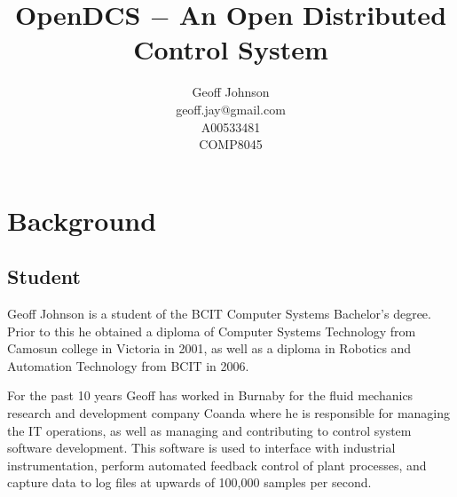 \documentclass[11pt]{article}
\begin{document}
\nocite{*}

  \title{%
    OpenDCS $-$ An Open Distributed Control System\vspace{2em}
  }

  \author{%
    Geoff Johnson \vspace{0.5em} \\
    geoff.jay@gmail.com \vspace{0.5em} \\
    A00533481 \vspace{0.5em} \\
    COMP8045 \vspace{0.5em}
  }

  \maketitle
  \thispagestyle{empty}
  \newpage
  \mbox{}
  \thispagestyle{empty}

  \newpage
  \addtocounter{page}{-1}
  \tableofcontents

  \newpage


  \section{Background}\label{sec:bg}

    \subsection{Student}\label{sec:bg-student}

      Geoff Johnson is a student of the BCIT Computer Systems Bachelor's degree.
      Prior to this he obtained a diploma of Computer Systems Technology from
      Camosun college in Victoria in 2001, as well as a diploma in Robotics and
      Automation Technology from BCIT in 2006.

      For the past 10 years Geoff has worked in Burnaby for the fluid mechanics
      research and development company Coanda where he is responsible for managing
      the IT operations, as well as managing and contributing to control system
      software development. This software is used to interface with industrial
      instrumentation, perform automated feedback control of plant processes,
      and capture data to log files at upwards of 100,000 samples per second.
\end{document}
